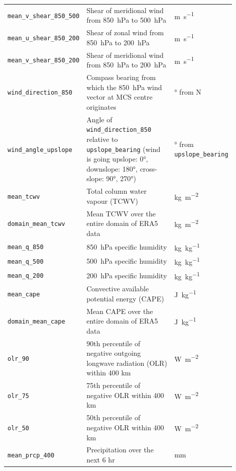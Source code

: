 {\begin{longtable}{>{\raggedright\arraybackslash}p{0.25\linewidth} p{0.50\linewidth} >{\raggedright\arraybackslash}p{0.15\linewidth}}
    \texttt{mean\_v\_shear\_850\_500} & Shear of meridional wind from \SI{850}{\hecto\pascal} to \SI{500}{\hecto\pascal} & \unit{\meter\per\second} \\
    \texttt{mean\_u\_shear\_850\_200} & Shear of zonal wind from \SI{850}{\hecto\pascal} to \SI{200}{\hecto\pascal} & \unit{\meter\per\second} \\
    \texttt{mean\_v\_shear\_850\_200} & Shear of meridional wind from \SI{850}{\hecto\pascal} to \SI{200}{\hecto\pascal} & \unit{\meter\per\second} \\
    \texttt{wind\_direction\_850} & Compass bearing from which the \SI{850}{\hecto\pascal} wind vector at MCS centre originates & \unit{\degree} from  N \\
    \texttt{wind\_angle\_upslope} & Angle of \texttt{wind\_direction\_850} relative to \texttt{upslope\_bearing} (wind is going upslope: \ang{0}, downslope: \ang{180}, cross-slope: \ang{90}, \ang{270}) & \unit{\degree} from \texttt{upslope\_bearing} \\
    \texttt{mean\_tcwv} & Total column water vapour (TCWV) & \unit{\kilogram\per\meter\squared} \\
    \texttt{domain\_mean\_tcwv} & Mean TCWV over the entire domain of ERA5 data & \unit{\kilogram\per\meter\squared} \\
    \texttt{mean\_q\_850} & \SI{850}{\hecto\pascal} specific humidity & \unit{\kilogram\per\kilogram} \\
    \texttt{mean\_q\_500} & \SI{500}{\hecto\pascal} specific humidity & \unit{\kilogram\per\kilogram} \\
    \texttt{mean\_q\_200} & \SI{200}{\hecto\pascal} specific humidity & \unit{\kilogram\per\kilogram} \\
    \texttt{mean\_cape} & Convective available potential energy (CAPE) & \unit{\joule\per\kilogram} \\
    \texttt{domain\_mean\_cape} & Mean CAPE over the entire domain of ERA5 data & \unit{\joule\per\kilogram} \\
    \texttt{olr\_90} & 90th percentile of negative outgoing longwave radiation (OLR) within 400 km & \unit{\watt\per\square\meter} \\
    \texttt{olr\_75} & 75th percentile of negative OLR within 400 km & \unit{\watt\per\square\meter} \\
    \texttt{olr\_50} & 50th percentile of negative OLR within 400 km & \unit{\watt\per\square\meter} \\
    \texttt{mean\_prcp\_400} & Precipitation over the next 6 hr & \unit{\milli\meter} \\

\end{longtable}}
